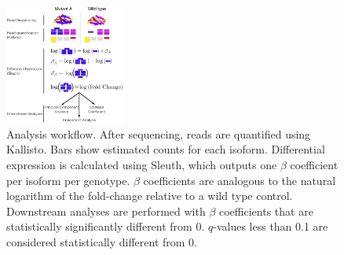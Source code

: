 \documentclass[9pt,twocolumn,twoside]{pnas-new}
\begin{document}
\begin{figure}[tbhp]
  \centering
  \includegraphics[width=0.35\textwidth]{../final_figs/meaningofbeta.pdf}
  \caption{
    Analysis workflow. After sequencing, reads are quantified using Kallisto.
    Bars show estimated counts for each isoform. Differential expression is
    calculated using Sleuth, which outputs one $\beta$ coefficient per isoform
    per genotype. $\beta$ coefficients are analogous to the natural logarithm of
    the fold-change relative to a wild type control. Downstream analyses are
    performed with $\beta$ coefficients that are statistically significantly
    different from 0. $q$-values less than 0.1 are considered statistically
    different from 0.
  }
\label{fig:explain}
\end{figure}
\end{document}
